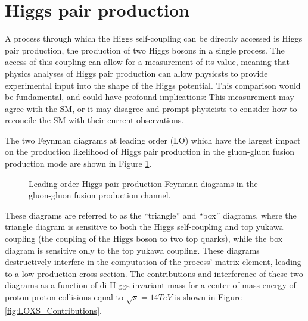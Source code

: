 \section{Higgs pair production} \label{sec:Higgs_Pair_Production}

A process through which the Higgs self-coupling can be directly accessed is Higgs pair production, the production of two Higgs bosons in a single process. The access of this coupling can allow for a measurement of its value, meaning that physics analyses of Higgs pair production can allow physicsts to provide experimental input into the shape of the Higgs potential. This comparison would be fundamental, and could have profound implications: This measurement may agree with the SM, or it may disagree and prompt physicists to consider how to reconcile the SM with their current observations. 

The two Feynman diagrams at leading order (LO) which have the largest impact on the production likelihood of Higgs pair production in the gluon-gluon fusion production mode are shown in Figure \ref{fig:HH_GF_LO_FD}.

\begin{figure}[H]%
    \setcounter{subfigure}{0} %
    \centering
    \qquad
    \caption{Leading order Higgs pair production Feynman diagrams in the gluon-gluon fusion production channel.}%
    \label{fig:HH_GF_LO_FD}
\end{figure}  

These diagrams are referred to as the ``triangle'' and ``box'' diagrams, where the triangle diagram is sensitive to both the Higgs self-coupling and top yukawa coupling (the coupling of the Higgs boson to two top quarks), while the box diagram is sensitive only to the top yukawa coupling. These diagrams destructively interfere in the computation of the process' matrix element, leading to a low production cross section. The contributions and interference of these two diagrams as a function of di-Higgs invariant mass for a center-of-mass energy of proton-proton collisions equal to $\sqrt{s} = 14 TeV$ is shown in Figure \ref{fig:LOXS_Contributions}. 

